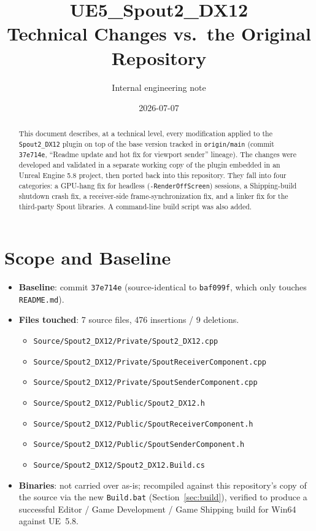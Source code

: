 \documentclass[11pt,a4paper]{article}
\title{\textbf{UE5\_Spout2\_DX12} \\ \large Technical Changes vs.\ the Original Repository}
\author{Internal engineering note}
\date{2026-07-07}
\begin{document}
\maketitle

\begin{abstract}
\noindent
This document describes, at a technical level, every modification applied
to the \texttt{Spout2\_DX12} plugin on top of the base version tracked in
\texttt{origin/main} (commit \texttt{37e714e}, ``Readme update and hot fix
for viewport sender'' lineage). The changes were developed and validated in
a separate working copy of the plugin embedded in an Unreal Engine 5.8
project, then ported back into this repository. They fall into four
categories: a GPU-hang fix for headless (\texttt{-RenderOffScreen})
sessions, a Shipping-build shutdown crash fix, a receiver-side
frame-synchronization fix, and a linker fix for the third-party Spout
libraries. A command-line build script was also added.
\end{abstract}

\tableofcontents

\section{Scope and Baseline}

\begin{itemize}
    \item \textbf{Baseline}: commit \texttt{37e714e} (source-identical to
        \texttt{baf099f}, which only touches \texttt{README.md}).
    \item \textbf{Files touched}: 7 source files, 476 insertions / 9
        deletions.
    \begin{itemize}[nosep]
        \item \texttt{Source/Spout2\_DX12/Private/Spout2\_DX12.cpp}
        \item \texttt{Source/Spout2\_DX12/Private/SpoutReceiverComponent.cpp}
        \item \texttt{Source/Spout2\_DX12/Private/SpoutSenderComponent.cpp}
        \item \texttt{Source/Spout2\_DX12/Public/Spout2\_DX12.h}
        \item \texttt{Source/Spout2\_DX12/Public/SpoutReceiverComponent.h}
        \item \texttt{Source/Spout2\_DX12/Public/SpoutSenderComponent.h}
        \item \texttt{Source/Spout2\_DX12/Spout2\_DX12.Build.cs}
    \end{itemize}
    \item \textbf{Binaries}: not carried over as-is; recompiled against
        this repository's copy of the source via the new \texttt{Build.bat}
        (Section~\ref{sec:build}), verified to produce a successful
        Editor / Game Development / Game Shipping build for Win64 against
        UE~5.8.
\end{itemize}
\end{document}
